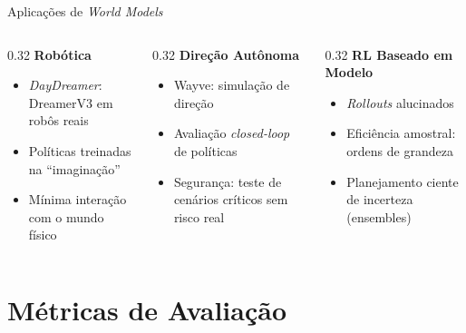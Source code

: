 \documentclass[aspectratio=169]{beamer}
\begin{document}
\begin{frame}{Aplicações de \textit{World Models}}
  \begin{columns}
    \begin{column}{0.32\textwidth}
      \textbf{Robótica}
      \begin{itemize}\small
        \item \textit{DayDreamer}: DreamerV3 em robôs reais
        \item Políticas treinadas na ``imaginação''
        \item Mínima interação com o mundo físico
      \end{itemize}
    \end{column}
    \begin{column}{0.32\textwidth}
      \textbf{Direção Autônoma}
      \begin{itemize}\small
        \item Wayve: simulação de direção
        \item Avaliação \textit{closed-loop} de políticas
        \item Segurança: teste de cenários críticos sem risco real
      \end{itemize}
    \end{column}
    \begin{column}{0.32\textwidth}
      \textbf{RL Baseado em Modelo}
      \begin{itemize}\small
        \item \textit{Rollouts} alucinados
        \item Eficiência amostral: ordens de grandeza
        \item Planejamento ciente de incerteza (ensembles)
      \end{itemize}
    \end{column}
  \end{columns}
\end{frame}

\section{Métricas de Avaliação}
\end{document}
